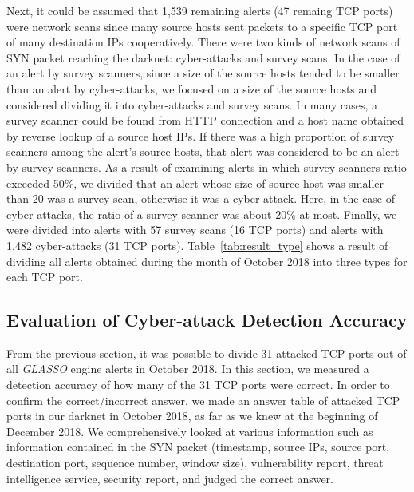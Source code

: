\documentclass[conference]{IEEEtran}
\begin{document}
Next, it could be assumed that 1,539 remaining alerts (47 remaing TCP ports) were network scans since many source hosts sent packets to a specific TCP port of many destination IPs cooperatively.
There were two kinds of network scans of SYN packet reaching the darknet: cyber-attacks and survey scans.
In the case of an alert by survey scanners, since a size of the source hosts tended to be smaller than an alert by cyber-attacks, we focused on a size of the source hosts and considered dividing it into cyber-attacks and survey scans.
In many cases, a survey scanner could be found from HTTP connection and a host name obtained by reverse lookup of a source host IPs.
If there was a high proportion of survey scanners among the alert's source hosts, that alert was considered to be an alert by survey scanners.
As a result of examining alerts in which survey scanners ratio exceeded 50\%, we divided that an alert whose size of source host was smaller than 20 was a survey scan, otherwise it was a cyber-attack.
Here, in the case of cyber-attacks, the ratio of a survey scanner was about 20\% at most.
Finally, we were divided into alerts with 57 survey scans (16 TCP ports) and alerts with 1,482 cyber-attacks (31 TCP ports).
Table~\ref{tab:result_type} shows a result of dividing all alerts obtained during the month of October 2018 into three types for each TCP port.







\subsection{Evaluation of Cyber-attack Detection Accuracy}
From the previous section, it was possible to divide 31 attacked TCP ports out of all {\it GLASSO} engine alerts in October 2018.
In this section, we measured a detection accuracy of how many of the 31 TCP ports were correct.
In order to confirm the correct/incorrect answer, we made an answer table of attacked TCP ports in our darknet in October 2018, as far as we knew at the beginning of December 2018.
We comprehensively looked at various information such as information contained in the SYN packet (timestamp, source IPs, source port, destination port, sequence number, window size), vulnerability report, threat intelligence service, security report, and judged the correct answer.
\end{document}
